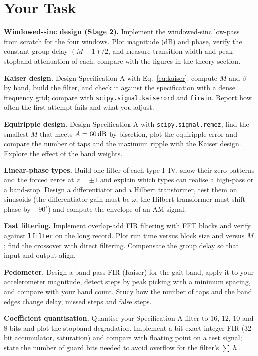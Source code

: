 \documentclass[11pt,a4paper]{article}
\begin{document}
\section*{Your Task}
\begin{tasks}
  \item \textbf{Windowed-sinc design (Stage 2).} Implement the windowed-sinc low-pass from scratch for the four windows. Plot magnitude (dB) and phase, verify the constant group delay $(M-1)/2$, and measure transition width and peak stopband attenuation of each; compare with the figures in the theory section.
  \item \textbf{Kaiser design.} Design Specification A with Eq.~\eqref{eq:kaiser}: compute $M$ and $\beta$ by hand, build the filter, and check it against the specification with a dense frequency grid; compare with \texttt{scipy.signal.kaiserord} and \texttt{firwin}. Report how often the first attempt fails and what you adjust.
  \item \textbf{Equiripple design.} Design Specification A with \texttt{scipy.signal.remez}, find the smallest $M$ that meets $A=\dB{60}$ by bisection, plot the equiripple error and compare the number of taps and the maximum ripple with the Kaiser design. Explore the effect of the band weights.
  \item \textbf{Linear-phase types.} Build one filter of each type I--IV, show their zero patterns and the forced zeros at $z=\pm1$ and explain which types can realise a high-pass or a band-stop. Design a differentiator and a Hilbert transformer, test them on sinusoids (the differentiator gain must be $\omega$, the Hilbert transformer must shift phase by $-90^\circ$) and compute the envelope of an AM signal.
  \item \textbf{Fast filtering.} Implement overlap-add FIR filtering with FFT blocks and verify against \texttt{lfilter} on the long record. Plot run time versus block size and versus $M$; find the crossover with direct filtering. Compensate the group delay so that input and output align.
  \item \textbf{Pedometer.} Design a band-pass FIR (Kaiser) for the gait band, apply it to your accelerometer magnitude, detect steps by peak picking with a minimum spacing, and compare with your hand count. Study how the number of taps and the band edges change delay, missed steps and false steps.
  \item \textbf{Coefficient quantisation.} Quantise your Specification-A filter to $16$, $12$, $10$ and $8$ bits and plot the stopband degradation. Implement a bit-exact integer FIR (32-bit accumulator, saturation) and compare with floating point on a test signal; state the number of guard bits needed to avoid overflow for the filter's $\sum|h|$.
\end{tasks}
\end{document}
